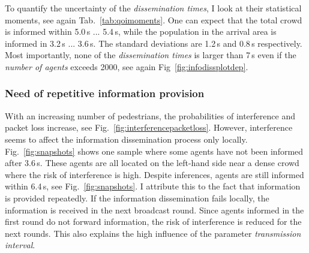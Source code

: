 To quantify the uncertainty of the \textit{dissemination times}, I look at their statistical moments, see again Tab.~\ref{tab:qoimoments}. One can expect that the total crowd is informed within  5.0\,s ... 5.4\,s, while the population in the arrival area is informed in 3.2\,s ... 3.6\,s. The standard deviations are 1.2\,s and 0.8\,s respectively. Most importantly, none of the \textit{dissemination times} is larger than 7\,s even if the \textit{number of agents} exceeds 2000, see again Fig~\ref{fig:infodissplotdep}.

\subsubsection{Need of repetitive information provision}

With an increasing number of pedestrians, the probabilities of interference and packet loss increase, see Fig.~\ref{fig:interferencepacketloss}. However, interference seems to affect the information dissemination process only locally.  Fig.~\ref{fig:snapshots} shows one sample where some agents have not been informed after 3.6\,s. These agents are all located on the left-hand side near a dense crowd where the risk of interference is high. 
Despite inferences, agents are still informed within 6.4\,s, see Fig.~\ref{fig:snapshots}. I attribute this to the fact that information is provided repeatedly. If the information dissemination fails locally, the information is received in the next broadcast round. Since agents informed in the first round do not forward information, the risk of interference is reduced for the next rounds. This also explains the high influence of the parameter \textit{transmission interval}.




